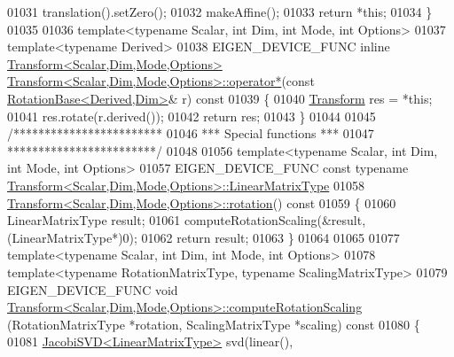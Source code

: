\begin{DoxyCode}
01031   translation().setZero();
01032   makeAffine();
01033   \textcolor{keywordflow}{return} *\textcolor{keyword}{this};
01034 \}
01035 
01036 \textcolor{keyword}{template}<\textcolor{keyword}{typename} Scalar, \textcolor{keywordtype}{int} Dim, \textcolor{keywordtype}{int} Mode, \textcolor{keywordtype}{int} Options>
01037 \textcolor{keyword}{template}<\textcolor{keyword}{typename} Derived>
01038 EIGEN\_DEVICE\_FUNC \textcolor{keyword}{inline} \hyperlink{group___geometry___module_class_eigen_1_1_transform}{Transform<Scalar,Dim,Mode,Options>} 
      \hyperlink{group___geometry___module_a4e44db730819ead6e555cf325cea3fd6}{Transform<Scalar,Dim,Mode,Options>::operator*}(\textcolor{keyword}{const} 
      \hyperlink{class_eigen_1_1_rotation_base}{RotationBase<Derived,Dim>}& r)\textcolor{keyword}{ const}
01039 \textcolor{keyword}{}\{
01040   \hyperlink{group___geometry___module_class_eigen_1_1_transform}{Transform} res = *\textcolor{keyword}{this};
01041   res.rotate(r.derived());
01042   \textcolor{keywordflow}{return} res;
01043 \}
01044 
01045 \textcolor{comment}{/************************}
01046 \textcolor{comment}{*** Special functions ***}
01047 \textcolor{comment}{************************/}
01048 
01056 \textcolor{keyword}{template}<\textcolor{keyword}{typename} Scalar, \textcolor{keywordtype}{int} Dim, \textcolor{keywordtype}{int} Mode, \textcolor{keywordtype}{int} Options>
01057 EIGEN\_DEVICE\_FUNC \textcolor{keyword}{const} \textcolor{keyword}{typename} 
      \hyperlink{group___core___module_class_eigen_1_1_matrix}{Transform<Scalar,Dim,Mode,Options>::LinearMatrixType}
01058 \hyperlink{group___geometry___module_a87eb429e076e2c15a1bfbe99b43ae07c}{Transform<Scalar,Dim,Mode,Options>::rotation}()\textcolor{keyword}{ const}
01059 \textcolor{keyword}{}\{
01060   LinearMatrixType result;
01061   computeRotationScaling(&result, (LinearMatrixType*)0);
01062   \textcolor{keywordflow}{return} result;
01063 \}
01064 
01065 
01077 \textcolor{keyword}{template}<\textcolor{keyword}{typename} Scalar, \textcolor{keywordtype}{int} Dim, \textcolor{keywordtype}{int} Mode, \textcolor{keywordtype}{int} Options>
01078 \textcolor{keyword}{template}<\textcolor{keyword}{typename} RotationMatrixType, \textcolor{keyword}{typename} ScalingMatrixType>
01079 EIGEN\_DEVICE\_FUNC \textcolor{keywordtype}{void} 
      \hyperlink{group___geometry___module_aff2a75622ed0a24dbe4bd22e5aeccb78}{Transform<Scalar,Dim,Mode,Options>::computeRotationScaling}
      (RotationMatrixType *rotation, ScalingMatrixType *scaling)\textcolor{keyword}{ const}
01080 \textcolor{keyword}{}\{
01081   \hyperlink{group___s_v_d___module_class_eigen_1_1_jacobi_s_v_d}{JacobiSVD<LinearMatrixType>} svd(linear(), 

\end{DoxyCode}
